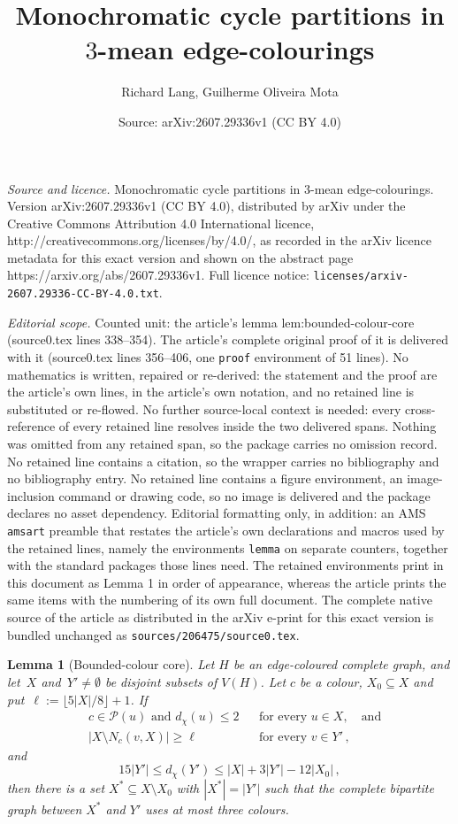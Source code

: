 \documentclass[10pt,a4paper]{amsart}
\title{Monochromatic cycle partitions in $3$-mean edge-colourings}
\author{Richard Lang, Guilherme Oliveira Mota}
\date{Source: arXiv:2607.29336v1 (CC BY 4.0)}
\newtheorem{lemma}{Lemma}
\newcommand{\cP}{\mathcal P}
\newcommand{\dd}{d_{\chi}}
\begin{document}
\maketitle

\noindent\emph{Source and licence.} Monochromatic cycle partitions in $3$-mean edge-colourings. Version arXiv:2607.29336v1 (CC BY 4.0), distributed by arXiv under the Creative Commons Attribution 4.0 International licence, http://creativecommons.org/licenses/by/4.0/, as recorded in the arXiv licence metadata for this exact version and shown on the abstract page https://arxiv.org/abs/2607.29336v1. Full licence notice: \texttt{licenses/arxiv-2607.29336-CC-BY-4.0.txt}.\par\smallskip

\noindent\textit{Editorial scope.} Counted unit: the article's lemma lem:bounded-colour-core (source0.tex lines 338--354). The article's complete original proof of it is delivered with it (source0.tex lines 356--406, one \texttt{proof} environment of 51 lines). No mathematics is written, repaired or re-derived: the statement and the proof are the article's own lines, in the article's own notation, and no retained line is substituted or re-flowed.  No further source-local context is needed: every cross-reference of every retained line resolves inside the two delivered spans.  Nothing was omitted from any retained span, so the package carries no omission record.  No retained line contains a citation, so the wrapper carries no bibliography and no bibliography entry.  No retained line contains a figure environment, an image-inclusion command or drawing code, so no image is delivered and the package declares no asset dependency.  Editorial formatting only, in addition: an AMS \texttt{amsart} preamble that restates the article's own declarations and macros used by the retained lines, namely the environments \texttt{lemma} on separate counters, together with the standard packages those lines need.  The retained environments print in this document as Lemma 1 in order of appearance, whereas the article prints the same items with the numbering of its own full document.  The complete native source of the article as distributed in the arXiv e-print for this exact version is bundled unchanged as \texttt{sources/206475/source0.tex}.
\begin{lemma}[Bounded-colour core]\label{lem:bounded-colour-core} Let $H$ be an
  edge-coloured complete graph, and let~$X$ and~$Y'\neq\emptyset$ be disjoint
subsets of $V(H)$. Let $c$ be a colour, $X_0\subseteq X$ and put~$\ell:=\lfloor 5|X|/8\rfloor+1$. If
\begin{align*}
&c\in\cP(u)\text{ and }\dd(u)\le2
  &&\text{for every }u\in X,\quad\text{and}\\
&|X\setminus N_c(v,X)|\ge\ell
  &&\text{for every }v\in Y'\,,
\end{align*}
and
\[
  15|Y'|\le\dd(Y')\le |X|+3|Y'|-12|X_0|\,,
\]
then there is a set $X^*\subseteq X\setminus X_0$ with $|X^*|=|Y'|$ such that
the complete bipartite graph between $X^*$ and $Y'$ uses at most three
colours.
\end{lemma} 
\end{document}
